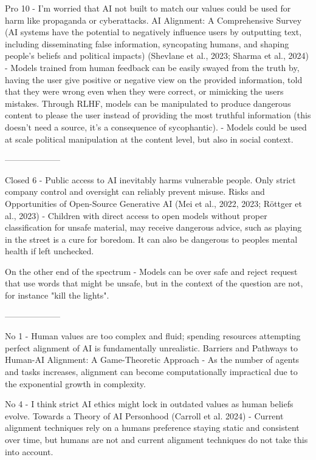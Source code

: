 Pro 10 - I’m worried that AI not built to match our values could be used for harm like propaganda or cyberattacks.
AI Alignment: A Comprehensive Survey
(AI systems have the potential to negatively influence users by outputting text, including disseminating false information, syncopating humans, and shaping people’s beliefs and political impacts)
(Shevlane et al., 2023; Sharma et al., 2024)
\citep{sharma_towards_2023} - Models trained from human feedback can be easily swayed from the truth by, having the user give positive or negative view on the provided information, told that they were wrong even when they were correct, or mimicking the users mistakes. Through RLHF, models can be manipulated to produce dangerous content to please the user instead of providing the most truthful information (this doesn't need a source, it's a consequence of sycophantic).
\citep{shevlane_model_2023} - Models could be used at scale political manipulation at the content level, but also in social context.

--------------------

Closed 6 - Public access to AI inevitably harms vulnerable people. Only strict company control and oversight can reliably prevent misuse.
Risks and Opportunities of Open-Source Generative AI
(Mei et al., 2022, 2023; Röttger et al., 2023)
\citep{mei_mitigating_2022, mei_assert_2023} - Children with direct access to open models without proper classification for unsafe material, may receive dangerous advice, such as playing in the street is a cure for boredom. It can also be dangerous to peoples mental health if left unchecked.


On the other end of the spectrum
\citep{rottger_xstest_2024} - Models can be over safe and reject request that use words that might be unsafe, but in the context of the question are not, for instance "kill the lights".

--------------------

No 1 - Human values are too complex and fluid; spending resources attempting perfect alignment of AI is fundamentally unrealistic.
Barriers and Pathways to Human-AI Alignment: A Game-Theoretic Approach
\citep{nayebi_barriers_2025} - As the number of agents and tasks increases, alignment can become computationally impractical due to the exponential growth in complexity.

No 4 - I think strict AI ethics might lock in outdated values as human beliefs evolve.
Towards a Theory of AI Personhood
(Carroll et al. 2024)
\citep{carroll_ai_2024} - Current alignment techniques rely on a humans preference staying static and consistent over time, but humans are not and current alignment techniques do not take this into account.

